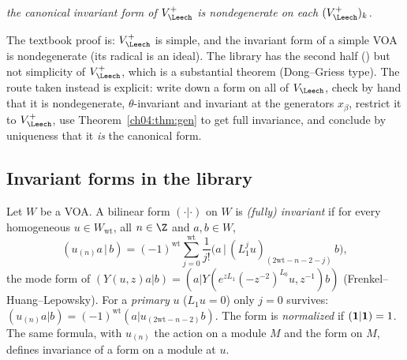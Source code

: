 \begin{center}
\emph{the canonical invariant form of $V_\Leech^+$ is nondegenerate on each $(V_\Leech^+)_k$.}
\end{center}

The textbook proof is: $V_\Leech^+$ is simple, and the invariant form of a simple VOA is nondegenerate
(its radical is an ideal). The library has the second half ()
but not simplicity of $V_\Leech^+$, which is a substantial theorem (Dong--Griess type). The route
taken instead is explicit: write down a form on all of $V_\Leech$, check by hand that it is
nondegenerate, $\theta$-invariant and invariant at the generators $x_\beta$, restrict it to
$V_\Leech^+$, use Theorem~\ref{ch04:thm:gen} to get full invariance, and conclude by uniqueness that
it \emph{is} the canonical form.

\subsection{Invariant forms in the library}

\begin{definition}\label{ch04:def:invform}
Let $W$ be a VOA. A bilinear form $(\cdot|\cdot)$ on $W$ is \emph{(fully) invariant} if for every
homogeneous $u\in W_{\mathrm{wt}}$, all $n\in\Z$ and $a,b\in W$,
\begin{equation}\label{ch04:eq:FHL}
  (u_{(n)}a\,|\,b)=(-1)^{\mathrm{wt}}\sum_{j=0}^{\mathrm{wt}}\frac{1}{j!}
  \big(a\,\big|\,(L_1^ju)_{(2\mathrm{wt}-n-2-j)}\,b\big),
\end{equation}
the mode form of $(Y(u,z)a|b)=(a|Y(e^{zL_1}(-z^{-2})^{L_0}u,z^{-1})b)$ (Frenkel--Huang--Lepowsky).
For a \emph{primary} $u$ ($L_1u=0$) only $j=0$ survives:
$(u_{(n)}a|b)=(-1)^{\mathrm{wt}}(a|u_{(2\mathrm{wt}-n-2)}b)$. The form is \emph{normalized} if
$(\mathbf{1}|\mathbf{1})=1$. The same formula, with $u_{(n)}$ the action on a module $M$ and the
form on $M$, defines invariance of a form on a module at $u$.
\end{definition}

